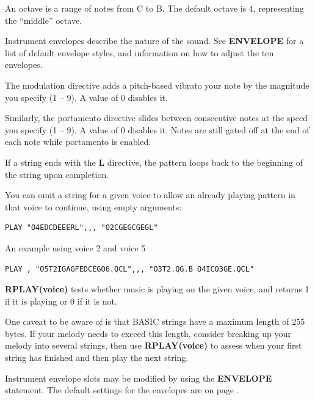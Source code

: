 \begin{description}[leftmargin=2cm,style=nextline]
                  An octave is a range of notes from C to B. The default octave is 4, representing the ``middle'' octave.

                  Instrument envelopes describe the nature of the sound. See {\bf ENVELOPE} for a list of default envelope styles, and information on how to adjust the ten envelopes.

                  The modulation directive adds a pitch-based vibrato your note by the magnitude you specify (1 -- 9). A value of 0 disables it.

                  Similarly, the portamento directive slides between consecutive notes at the speed you specify (1 -- 9). A value of 0 disables it. Notes are still gated off at the end of each note while portamento is enabled.

                  If a string ends with the {\bf L} directive, the pattern loops back to the beginning of the string upon completion.

                  You can omit a string for a given voice to allow an already playing pattern in that voice to continue, using empty arguments:

\begin{tcolorbox}[colback=black,coltext=white]
\verbatimfont{\codefont}
\begin{verbatim}
PLAY "O4EDCDEEERL",,, "O2CGEGCGEGL"
\end{verbatim}
\end{tcolorbox}

                  An example using voice 2 and voice 5

\begin{tcolorbox}[colback=black,coltext=white]
\verbatimfont{\codefont}
\begin{verbatim}
PLAY , "O5T2IGAGFEDCEGO6.QCL",,, "O3T2.QG.B O4ICO3GE.QCL"
\end{verbatim}
\end{tcolorbox}

                  {\bf RPLAY(voice)} tests whether music is playing on the given voice, and returns 1 if it is playing or 0 if it is not.

                  One caveat to be aware of is that BASIC strings have a maximum length of 255 bytes. If your melody needs to exceed this length, consider breaking up your melody into several strings, then use {\bf RPLAY(voice)} to assess when your first string has finished and then play the next string.

                  Instrument envelope slots may be modified by using the {\bf ENVELOPE} statement. The default settings for the envelopes are on page \pageref{envelopetable}.


\end{description}
